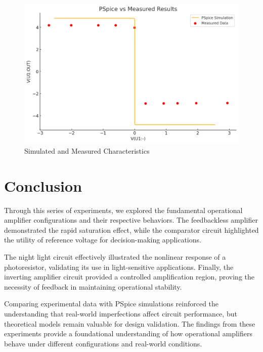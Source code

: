 \documentclass[12pt]{article}
\begin{document}
\begin{figure}[H]
	\centering
	\includegraphics[width=12cm]{03_pspice}
	\caption{Simulated and Measured Characteristics}
	\label{fig:03_pspice}
\end{figure}

\section{Conclusion}
Through this series of experiments, we explored the fundamental operational amplifier configurations and their respective behaviors. The feedbackless amplifier demonstrated the rapid saturation effect, while the comparator circuit highlighted the utility of reference voltage for decision-making applications.

The night light circuit effectively illustrated the nonlinear response of a photoresistor, validating its use in light-sensitive applications. Finally, the inverting amplifier circuit provided a controlled amplification region, proving the necessity of feedback in maintaining operational stability.

Comparing experimental data with PSpice simulations reinforced the understanding that real-world imperfections affect circuit performance, but theoretical models remain valuable for design validation. The findings from these experiments provide a foundational understanding of how operational amplifiers behave under different configurations and real-world conditions.
\end{document}
